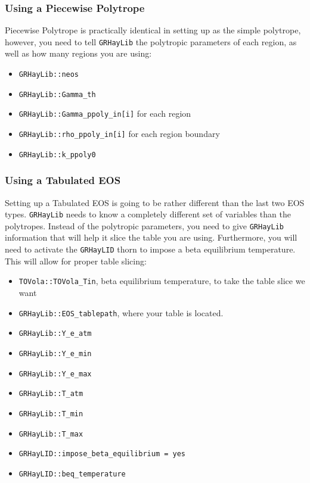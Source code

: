 \subsubsection{Using a Piecewise Polytrope}

Piecewise Polytrope is practically identical in setting up as the simple polytrope, however, you need to tell \texttt{GRHayLib} the polytropic parameters of each region, as well as how many regions you are using:

\begin{itemize}
    \item \texttt{GRHayLib::neos}
    \item \texttt{GRHayLib::Gamma\_th}
    \item \texttt{GRHayLib::Gamma\_ppoly\_in[i]} for each region
    \item \texttt{GRHayLib::rho\_ppoly\_in[i]} for each region boundary
    \item \texttt{GRHayLib::k\_ppoly0}
\end{itemize}

\subsubsection{Using a Tabulated EOS}

Setting up a Tabulated EOS is going to be rather different than the last two EOS types. \texttt{GRHayLib} needs to know a completely different set of variables than the polytropes. Instead of the polytropic parameters, you need to give \texttt{GRHayLib} information that will help it slice the table you are using. Furthermore, you will need to activate the \texttt{GRHayLID} thorn to impose a beta equilibrium temperature. This will allow for proper table slicing:

\begin{itemize}
    \item \texttt{TOVola::TOVola\_Tin}, beta equilibrium temperature, to take the table slice we want
    \item \texttt{GRHayLib::EOS\_tablepath}, where your table is located.
    \item \texttt{GRHayLib::Y\_e\_atm}
    \item \texttt{GRHayLib::Y\_e\_min}
    \item \texttt{GRHayLib::Y\_e\_max}
    \item \texttt{GRHayLib::T\_atm}
    \item \texttt{GRHayLib::T\_min}
    \item \texttt{GRHayLib::T\_max}
    \item \texttt{GRHayLID::impose\_beta\_equilibrium = yes}
    \item \texttt{GRHayLID::beq\_temperature}
\end{itemize}

